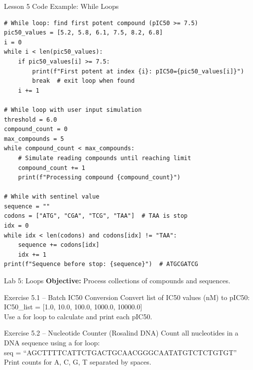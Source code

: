 \documentclass{beamer}
\begin{document}
\begin{frame}[fragile]{Lesson 5 Code Example: While Loops}
    \small
    \begin{lstlisting}[style=codeStyle]
# While loop: find first potent compound (pIC50 >= 7.5)
pic50_values = [5.2, 5.8, 6.1, 7.5, 8.2, 6.8]
i = 0
while i < len(pic50_values):
    if pic50_values[i] >= 7.5:
        print(f"First potent at index {i}: pIC50={pic50_values[i]}")
        break  # exit loop when found
    i += 1

# While loop with user input simulation
threshold = 6.0
compound_count = 0
max_compounds = 5
while compound_count < max_compounds:
    # Simulate reading compounds until reaching limit
    compound_count += 1
    print(f"Processing compound {compound_count}")

# While with sentinel value
sequence = ""
codons = ["ATG", "CGA", "TCG", "TAA"]  # TAA is stop
idx = 0
while idx < len(codons) and codons[idx] != "TAA":
    sequence += codons[idx]
    idx += 1
print(f"Sequence before stop: {sequence}")  # ATGCGATCG
    \end{lstlisting}
\end{frame}

\begin{frame}{\textcolor{labcolor}{Lab 5: Loops}}
    \footnotesize
    \textbf{Objective:} Process collections of compounds and sequences.
    \vspace{0.3em}
    \begin{block}{Exercise 5.1 -- Batch IC50 Conversion}
        Convert list of IC50 values (nM) to pIC50:\\
        IC50\_list = [1.0, 10.0, 100.0, 1000.0, 10000.0]\\
        Use a for loop to calculate and print each pIC50.
    \end{block}
    \vspace{0.2em}
    \begin{block}{Exercise 5.2 -- Nucleotide Counter (Rosalind DNA)}
        Count all nucleotides in a DNA sequence using a for loop:\\
        seq = ``AGCTTTTCATTCTGACTGCAACGGGCAATATGTCTCTGTGT''\\
        Print counts for A, C, G, T separated by spaces.
    \end{block}
\end{frame}
\end{document}
